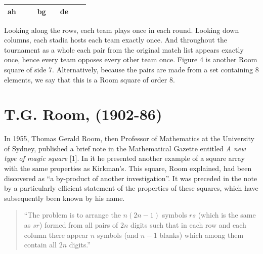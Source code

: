 \documentclass[
  12pt,
  a4paper]{book}
\begin{document}
\begin{longtable}[]{@{}cccccccc@{}}
\begin{minipage}[t]{0.05\columnwidth}
ah\strut
\end{minipage} & \begin{minipage}[t]{0.05\columnwidth}\centering
\strut
\end{minipage} & \begin{minipage}[t]{0.05\columnwidth}\centering
\strut
\end{minipage} & \begin{minipage}[t]{0.05\columnwidth}\centering
bg\strut
\end{minipage} & \begin{minipage}[t]{0.05\columnwidth}\centering
\strut
\end{minipage} & \begin{minipage}[t]{0.05\columnwidth}\centering
de\strut
\end{minipage}\tabularnewline
\bottomrule
\end{longtable}

Looking along the rows, each team plays once in each round. Looking down
columns, each stadia hosts each team exactly once. And throughout the
tournament as a whole each pair from the original match list appears
exactly once, hence every team opposes every other team once. Figure 4
is another Room square of side 7. Alternatively, because the pairs are
made from a set containing 8 elements, we say that this is a Room square
of order 8.

\hypertarget{t.g.-room-1902-86}{%
\section{T.G. Room, (1902-86)}\label{t.g.-room-1902-86}}

In 1955, Thomas Gerald Room, then Professor of Mathematics at the
University of Sydney, published a brief note in the Mathematical Gazette
entitled \emph{A new type of magic square} {[}1{]}. In it he presented
another example of a square array with the same properties as Kirkman's.
This square, Room explained, had been discovered as ``a by-product of
another investigation''. It was preceded in the note by a particularly
efficient statement of the properties of these squares, which have
subsequently been known by his name.

\begin{quote}
``The problem is to arrange the \(n(2n-1)\) symbols \(rs\) (which is the
same as \(sr\)) formed from all pairs of \(2n\) digits such that in each
row and each column there appear \(n\) symbols (and \(n-1\) blanks)
which among them contain all \(2n\) digits.''
\end{quote}
\end{document}
